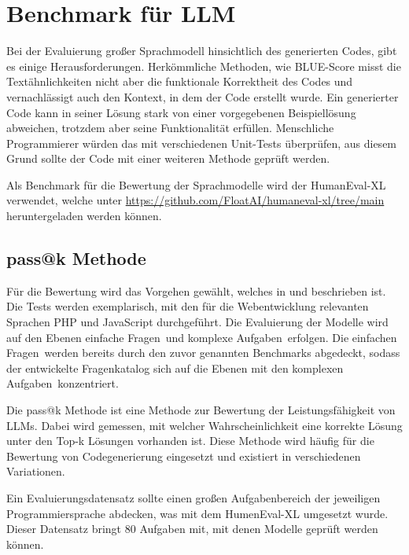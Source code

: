 

\section{Benchmark für LLM}
Bei der Evaluierung großer Sprachmodell hinsichtlich des generierten Codes, gibt es einige Herausforderungen. Herkömmliche Methoden, wie BLUE-Score misst die Textähnlichkeiten nicht aber die funktionale Korrektheit des Codes und vernachlässigt auch den Kontext, in dem der Code erstellt wurde. Ein generierter Code kann in seiner Lösung stark von einer vorgegebenen Beispiellösung abweichen, trotzdem aber seine Funktionalität erfüllen. Menschliche Programmierer würden das mit verschiedenen Unit-Tests überprüfen, aus diesem Grund sollte der Code mit einer weiteren Methode geprüft werden.\vspace{0.2cm}

Als Benchmark für die Bewertung der Sprachmodelle wird der HumanEval-XL verwendet, welche unter \href{https://github.com/FloatAI/humaneval-xl/tree/main}{https://github.com/FloatAI/humaneval-xl/tree/main} heruntergeladen werden können.

\subsection{pass@k Methode}\label{subsec:pass_at_k}
Für die Bewertung wird das Vorgehen gewählt, welches in \cite{chen-2021} und \cite{peng-2024} beschrieben ist. Die Tests werden exemplarisch, mit den für die Webentwicklung relevanten Sprachen PHP und JavaScript durchgeführt. Die Evaluierung der Modelle wird auf den Ebenen \glqq einfache Fragen\grqq \ und \glqq komplexe Aufgaben\grqq \ erfolgen. Die \glqq einfachen Fragen\grqq \ werden bereits durch den zuvor genannten Benchmarks abgedeckt, sodass der entwickelte Fragenkatalog sich auf die Ebenen mit den \glqq komplexen Aufgaben\grqq \ konzentriert.\vspace{0.2cm}

Die pass@k Methode ist eine Methode zur Bewertung der Leistungsfähigkeit von LLMs. Dabei wird gemessen, mit welcher Wahrscheinlichkeit eine korrekte Lösung unter den Top-k Lösungen vorhanden ist. Diese Methode wird häufig für die Bewertung von Codegenerierung eingesetzt und existiert in verschiedenen Variationen.\vspace{0.2cm}

Ein Evaluierungsdatensatz sollte einen großen Aufgabenbereich der jeweiligen Programmiersprache abdecken, was mit dem HumenEval-XL umgesetzt wurde. Dieser Datensatz bringt 80 Aufgaben mit, mit denen Modelle geprüft werden können.\vspace{0.2cm}

